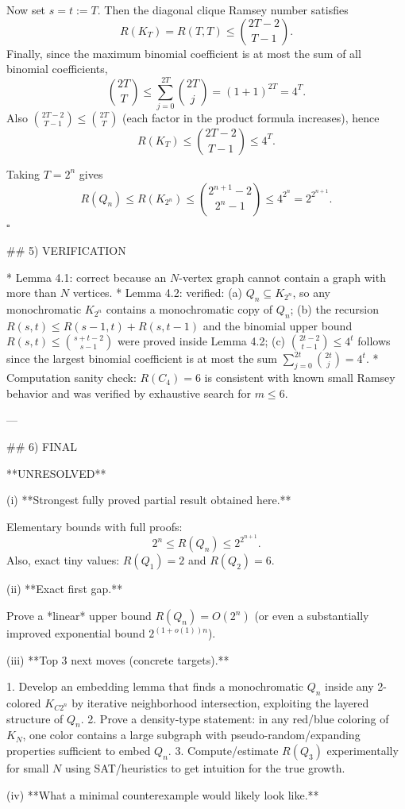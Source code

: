 Now set $s=t:=T$.
Then the diagonal clique Ramsey number satisfies
\[
R(K_T)=R(T,T)\le \binom{2T-2}{T-1}.
\]
Finally, since the maximum binomial coefficient is at most the sum of all binomial coefficients,
\[
\binom{2T}{T}\le \sum_{j=0}^{2T}\binom{2T}{j}=(1+1)^{2T}=4^T.
\]
Also $\binom{2T-2}{T-1}\le \binom{2T}{T}$ (each factor in the product formula increases), hence
\[
R(K_T)\le \binom{2T-2}{T-1}\le 4^T.
\]

Taking $T=2^n$ gives
\[
R(Q_n)\le R(K_{2^n})\le \binom{2^{n+1}-2}{2^n-1}\le 4^{2^n}=2^{2^{n+1}}.
\]
$\square$

## 5) VERIFICATION

* Lemma 4.1: correct because an $N$-vertex graph cannot contain a graph with more than $N$ vertices.
* Lemma 4.2: verified: (a) $Q_n\subseteq K_{2^n}$, so any monochromatic $K_{2^n}$ contains a monochromatic copy of $Q_n$; (b) the recursion $R(s,t)\le R(s-1,t)+R(s,t-1)$ and the binomial upper bound $R(s,t)\le \binom{s+t-2}{s-1}$ were proved inside Lemma 4.2; (c) $\binom{2t-2}{t-1}\le 4^t$ follows since the largest binomial coefficient is at most the sum $\sum_{j=0}^{2t}\binom{2t}{j}=4^t$.
* Computation sanity check: $R(C_4)=6$ is consistent with known small Ramsey behavior and was verified by exhaustive search for $m\le 6$.

---

## 6) FINAL

**UNRESOLVED**

(i) **Strongest fully proved partial result obtained here.**

Elementary bounds with full proofs:
\[
2^n\le R(Q_n)\le 2^{2^{n+1}}.
\]
Also, exact tiny values: $R(Q_1)=2$ and $R(Q_2)=6$.

(ii) **Exact first gap.**

Prove a *linear* upper bound $R(Q_n)=O(2^n)$ (or even a substantially improved exponential bound $2^{(1+o(1))n}$).

(iii) **Top 3 next moves (concrete targets).**

1. Develop an embedding lemma that finds a monochromatic $Q_n$ inside any 2-colored $K_{C2^n}$ by iterative neighborhood intersection, exploiting the layered structure of $Q_n$.
2. Prove a density-type statement: in any red/blue coloring of $K_{N}$, one color contains a large subgraph with pseudo-random/expanding properties sufficient to embed $Q_n$.
3. Compute/estimate $R(Q_3)$ experimentally for small $N$ using SAT/heuristics to get intuition for the true growth.

(iv) **What a minimal counterexample would likely look like.**

